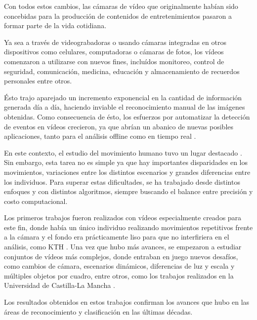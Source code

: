 Con todos estos cambios, las cámaras de vídeo que originalmente habían sido concebidas para la producción de contenidos de entretenimientos pasaron a
formar parte de la vida cotidiana.

Ya sea a través de videograbadoras o usando cámaras integradas en otros dispositivos como celulares, computadoras o cámaras de fotos, los vídeos
comenzaron a utilizarse con nuevos fines, incluídos monitoreo, control de seguridad, comunicación, medicina,  educación y almacenamiento de recuerdos
personales entre otros.

Ésto trajo aparejado un incremento exponencial en la cantidad de información generada día a día, haciendo inviable el reconocimiento manual de las
imágenes obtenidas. Como consecuencia de ésto, los esfuerzos por automatizar la detección de eventos en vídeos crecieron, ya que abrían un abanico
de nuevas posibles aplicaciones, tanto para el análisis offline como en tiempo real \parencite{whiten2013mofreak}.

En este contexto, el estudio del movimiento humano tuvo un lugar destacado \parencite{poppe2010survey}. Sin embargo, esta tarea no es simple ya que hay
importantes disparidades en los movimientos, variaciones entre los distintos escenarios y grandes diferencias entre los individuos. Para superar estas
dificultades, se ha trabajado desde distintos enfoques y con distintos algoritmos, siempre buscando el balance entre precisión y costo computacional.

Los primeros trabajos fueron realizados con vídeos especialmente creados para este fin, donde había un único individuo realizando movimientos repetitivos
frente a la cámara y el fondo era prácticamente liso para que no interfiriera en el análisis, como KTH \parencite{schuldt2004recognizing}. Una vez que hubo
más avances, se empezaron a estudiar conjuntos de vídeos más complejos, donde entraban en juego nuevos desafíos, como cambios de cámara, escenarios
dinámicos, diferencias de luz y escala y múltiples objetos por cuadro, entre otros, como los trabajos realizados en la Universidad de Castilla-La
Mancha \parencite{nievas2011violence, deniz2014fast}.

Los resultados obtenidos en estos trabajos confirman los avances que hubo en las áreas de reconocimiento y clasificación en las últimas décadas.





\iffalse
Un método común y que ha resultado ser eficiente para obtener información a partir de imágenes es la utilización de descriptores.
Estos descriptores informan acerca de las características visuales de la imagen, describiendo características elementales como la forma, el color,
la textura y la ubicación de elementos dentro de la misma.
Para extender esta idea al plano de los videos, lo que se hace es desglosar el video en las imágenes que lo componen (frames), para luego analizar por separado
cada una de ellas. Con esta información ya disponible se incorpora el factor temporal, siendo éste el eje en la relación entre los distintos frames, permitiendo,
por ejemplo, analizar variaciones de un frame a otro.
\fi
